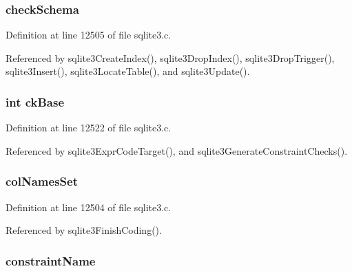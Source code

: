 \subsubsection[{check\+Schema}]{ check\+Schema}\label{struct_parse_ab88e9b991c31238e6c7af0564bb247dd}


Definition at line 12505 of file sqlite3.\+c.



Referenced by sqlite3\+Create\+Index(), sqlite3\+Drop\+Index(), sqlite3\+Drop\+Trigger(), sqlite3\+Insert(), sqlite3\+Locate\+Table(), and sqlite3\+Update().

\hypertarget{struct_parse_a199c7e2d7e263358656b2cbea891ed79}{}
\subsubsection[{ck\+Base}]{\setlength{\rightskip}{0pt plus 5cm}int ck\+Base}\label{struct_parse_a199c7e2d7e263358656b2cbea891ed79}


Definition at line 12522 of file sqlite3.\+c.



Referenced by sqlite3\+Expr\+Code\+Target(), and sqlite3\+Generate\+Constraint\+Checks().

\hypertarget{struct_parse_a12d1772418cdeef91cea6350395f21e5}{}
\subsubsection[{col\+Names\+Set}]{ col\+Names\+Set}\label{struct_parse_a12d1772418cdeef91cea6350395f21e5}


Definition at line 12504 of file sqlite3.\+c.



Referenced by sqlite3\+Finish\+Coding().

\hypertarget{struct_parse_ae7b8e7eeb5898d90d0b59cd04c9302ab}{}
\subsubsection[{constraint\+Name}]{ constraint\+Name}\label{struct_parse_ae7b8e7eeb5898d90d0b59cd04c9302ab}


